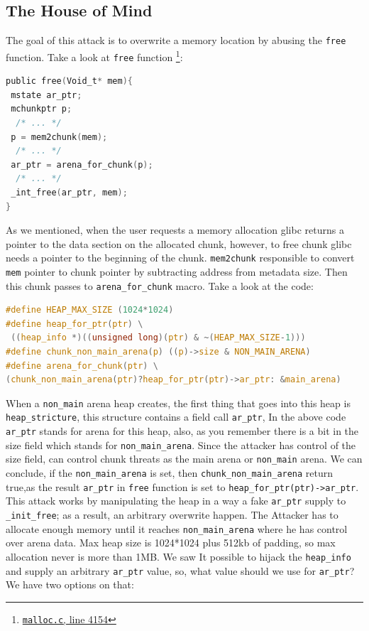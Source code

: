 \documentclass{masterthesis}
\newcommand*\libc{glibc}
\newcommand*\freec{\lstinline{free}\xspace}
\begin{document}
\subsection{The House of Mind}
\label{subsect:housemind}
The goal of this attack is to overwrite a memory location by abusing the \freec{} function. Take a look at \freec{} function \footnote{\href{https://sourceware.org/git/?p=glibc.git;a=blob;f=malloc/malloc.c;h=f7cd29bc2f93e1082ee77800bd64a4b2a2897055;hb=9ea3686266dca3f004ba874745a4087a89682617\#l4154}{\texttt{malloc.c}, line 4154}}:
\begin{lstlisting}[language=c,frame=tlrb]
public free(Void_t* mem){
 mstate ar_ptr;
 mchunkptr p;
  /* ... */
 p = mem2chunk(mem);
  /* ... */
 ar_ptr = arena_for_chunk(p);
  /* ... */
 _int_free(ar_ptr, mem);
}
 \end{lstlisting}
As we mentioned, when the user requests a memory allocation \libc{} returns a pointer to the data section on the allocated chunk, however, to free chunk \libc{} needs a pointer to the beginning of the chunk. \lstinline{mem2chunk} responsible to convert \lstinline{mem} pointer to chunk pointer by subtracting address from metadata size. Then this chunk passes to \lstinline{arena_for_chunk} macro. Take a look at the code:

\begin{lstlisting}[language=c,frame=tlrb]
#define HEAP_MAX_SIZE (1024*1024)
#define heap_for_ptr(ptr) \
 ((heap_info *)((unsigned long)(ptr) & ~(HEAP_MAX_SIZE-1)))
#define chunk_non_main_arena(p) ((p)->size & NON_MAIN_ARENA)
#define arena_for_chunk(ptr) \
(chunk_non_main_arena(ptr)?heap_for_ptr(ptr)->ar_ptr: &main_arena)
 \end{lstlisting}

When a \lstinline{non_main} arena heap creates, the first thing that goes into this heap is \lstinline{heap_stricture}, this structure contains a field call \lstinline{ar_ptr}, In the above code \lstinline{ar_ptr} stands for arena for this heap, also, as you remember there is a bit in the size field which stands for \lstinline{non_main_arena}. Since the attacker has control of the size field, can control chunk threats as the main arena or \lstinline{non_main} arena. We can conclude, if the \lstinline{non_main_arena} is set, then \lstinline{chunk_non_main_arena} return true,as the result \lstinline{ar_ptr} in \freec{} function is set to \lstinline{heap_for_ptr(ptr)->ar_ptr}.
This attack works by manipulating the heap in a way a fake \lstinline{ar_ptr} supply to \lstinline{_init_free}; as a result, an arbitrary overwrite happen. The Attacker has to allocate enough memory until it reaches \lstinline{non_main_arena} where he has control over arena data. Max heap size is 1024*1024 plus 512kb of padding, so max allocation never is more than 1MB.
We saw It possible to hijack the \lstinline{heap_info} and supply an arbitrary \lstinline{ar_ptr} value, so, what value should we use for \lstinline{ar_ptr}? We have two options on that:
\end{document}
